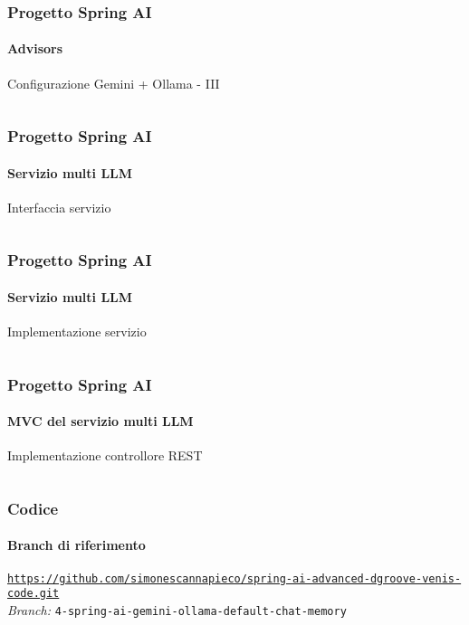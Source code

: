 %
\begin{frame}[t,fragile] \frametitle{Progetto Spring AI}
    \framesubtitle{Advisors}
        \vspace*{-.7cm}
        \begin{block}{Configurazione Gemini + Ollama - III}
			{\tiny\inputminted{java}{code/MemoryChatClientConfig-3.java}}
    	\end{block}
\end{frame}
%
\begin{frame}[t,fragile] \frametitle{Progetto Spring AI}
    \framesubtitle{Servizio multi LLM}
        \begin{block}{Interfaccia servizio}
			{\tiny\inputminted{java}{code/QuestionService.java}}
    	\end{block}
\end{frame}
%
\begin{frame}[t,fragile] \frametitle{Progetto Spring AI}
    \framesubtitle{Servizio multi LLM}
        \vspace*{-.7cm}
        \begin{block}{Implementazione servizio}
			{\tiny\inputminted{java}{code/QuestionServiceImpl.java}}
    	\end{block}
\end{frame}
%
\begin{frame}[t,fragile] \frametitle{Progetto Spring AI}
    \framesubtitle{MVC del servizio multi LLM}
    	\vspace*{-.7cm}
        \begin{block}{Implementazione controllore REST}
			{\tiny\inputminted{java}{code/QuestionController.java}}
    	\end{block}
\end{frame}
%
\begin{frame}[fragile] \frametitle{Codice}
    \framesubtitle{Branch di riferimento}
	\begin{center}
		{\scriptsize \href{https://github.com/simonescannapieco/spring-ai-advanced-dgroove-venis-code.git}{\texttt{https://github.com/simonescannapieco/spring-ai-advanced-dgroove-venis-code.git}}}\\
		\textit{Branch:} \alert{\texttt{4-spring-ai-gemini-ollama-default-chat-memory}}
	\end{center}
\end{frame}